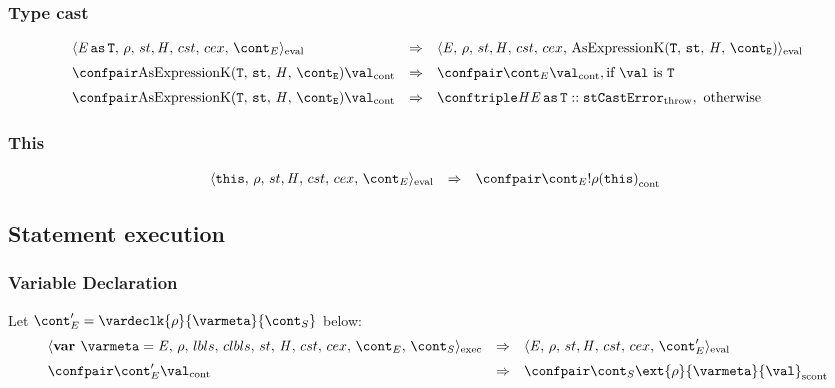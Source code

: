 \documentclass{article}
\begin{document}
\subsubsection{Type cast}
\label{subsubsec:type-cast}
\newcommand{\AsExpressionK}{\mathrm{AsExpressionK}(\tt{T},\,\strace,\,\handler,\,\econt)}
\[
  \begin{array}{lcl}
	\cesktrans{
		\evalconf{\AsExpression{\expressionmeta}{\tt{T}}}{\env}{\strace}{\cstrace}{\cex}{\econt}}{
		\evalconf{\expressionmeta}{\env}{\strace}{\cstrace}{\cex}{\AsExpressionK}}
		\\[2mm]

	\cesktrans{
		\contconf{\AsExpressionK}{\val}}{
		\contconf{\econt}{\val}}, \textrm{if }\val \textrm{ is } \tt{T}\\[2mm]

	\cesktrans{
		\contconf{\AsExpressionK}{\val}}{
		\throwconf{\handler}{\AsExpression{\expressionmeta}{\tt{T}} :: \strace}{\tt{CastError}}}, \textrm{ otherwise}
    \end{array}
\]

\subsubsection{This}
\[
  \begin{array}{lcl}
	\cesktrans{
		\evalconf{\ThisExpression}{\env}{\strace}{\cstrace}{\cex}{\econt}}{
		\contconf{\econt}{\deref{\env(\this)}}}
  $  $\end{array}
\]
\subsection{Statement execution}
\label{subsec:stmt-exectution}

\subsubsection{Variable Declaration}

Let $\econt' = \vardeclk{\env}{\varmeta}{\scont}$ below:
\[
  \begin{array}{lcl}
	\execconf{\textbf{var } \varmeta = \expr}{\env}{\lbls}{\clbls}{\handler}{\cstrace}{\cex}{\econt}{\scont}
	& \Rightarrow &
	\evalconf{\expr}{\env}{\strace}{\cstrace}{\cex}{\econt'}\\[2mm]

	\contconf{\econt'}{\val}
	& \Rightarrow &
	\scontconf{\scont}{\ext{\env}{\varmeta}{\val}}

  \end{array}
\]
\end{document}
